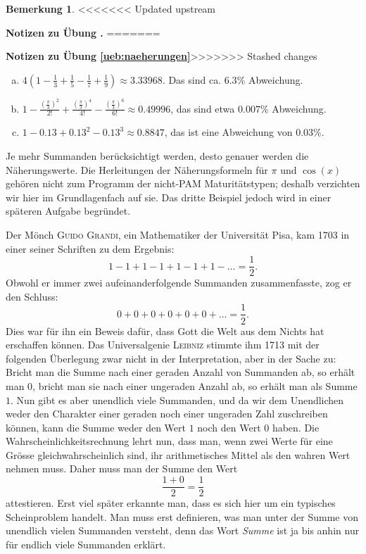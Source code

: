 \documentclass[%
11pt,%
twoside,%
titlepage,%
swissgerman,%
headsepline%
]{scrartcl}
\newcommand{\faReturnGray}{\textcolor{gray}{\faMailReply}} %
\theoremstyle{definition}
\newtheorem{bem}{Bemerkung}[subsection] %
\theoremstyle{plain}
\newcommand{\concatueb}[1]{ueb:#1}%
\newcommand{\concatlsg}[1]{lsg:#1}%
\newcounter{uebcounter}[section]
\renewcommand{\theuebcounter}{\thesection.\arabic{uebcounter}}  %
\newenvironment{lsg}[1]{%
<<<<<<< Updated upstream
    \par\noindent\textbf{Notizen zu Übung \theuebcounter\label{\concatlsg{#1}}}
=======
    \par\noindent\textbf{Notizen zu Übung \ref{\concatueb{#1}}}\label{\concatlsg{#1}}
>>>>>>> Stashed changes
    \hfill\hyperref[\concatueb{#1}]{\faReturnGray}\par %
}{%
    \par%
}
\begin{document}
\begin{bem}
\begin{lsg}{naeherungen}
    \begin{enumerate}[a)]
        \item $4(1-\frac{1}{3}+\frac{1}{5}-\frac{1}{7}+\frac{1}{9})\approx3.33968$. Das sind ca. $6.3\%$ Abweichung.
        \item $1-\frac{(\tfrac{\pi}{3})^2}{2!}+\frac{(\tfrac{\pi}{3})^4}{4!}-\frac{(\tfrac{\pi}{3})^6}{6!}\approx0.49996$, das sind etwa $0.007\%$ Abweichung.
        \item $1-0.13+0.13^2-0.13^3\approx0.8847$, das ist eine Abweichung von $0.03\%$.
    \end{enumerate}
\end{lsg}

Je mehr Summanden ber\"ucksichtigt werden, desto genauer werden die N\"aherungswerte. Die Herleitungen der N\"aherungsformeln f\"ur $\pi$ und $\cos(x)$ geh\"oren nicht zum Programm der nicht-PAM Maturit\"atstypen; deshalb verzichten wir hier im Grundlagenfach auf sie. Das dritte Beispiel jedoch wird in einer sp\"ateren Aufgabe begr\"undet.

Der M\"onch \textsc{Guido Grandi}, ein Mathematiker der Universit\"at Pisa, kam 1703 in einer seiner Schriften zu dem Ergebnis:
$$1-1+1-1+1-1+1-\dots=\frac{1}{2}.$$
Obwohl er immer zwei aufeinanderfolgende Summanden zusammenfasste, zog er den Schluss:
$$0+0+0+0+0+0+\dots=\frac{1}{2}.$$
Dies war f\"ur ihn ein Beweis daf\"ur, dass Gott die Welt aus dem Nichts hat erschaffen k\"onnen. Das Universalgenie \textsc{Leibniz} stimmte ihm 1713 mit der folgenden Überlegung zwar nicht in der Interpretation, aber in der Sache zu: Bricht man die Summe nach einer geraden Anzahl von Summanden ab, so erh\"alt man $0$, bricht man sie nach einer ungeraden Anzahl ab, so erh\"alt man als Summe $1$. Nun gibt es aber unendlich viele Summanden, und da wir dem Unendlichen weder den Charakter einer geraden noch einer ungeraden Zahl zuschreiben k\"onnen, kann die Summe weder den Wert $1$ noch den Wert $0$ haben. Die Wahrscheinlichkeitsrechnung lehrt nun, dass man, wenn zwei Werte f\"ur eine Gr\"osse gleichwahrscheinlich sind, ihr arithmetisches Mittel als den wahren Wert nehmen muss. Daher muss man der Summe den Wert
$$\frac{1+0}{2}=\frac{1}{2}$$
attestieren. Erst viel sp\"ater erkannte man, dass es sich hier um ein typisches Scheinproblem handelt. Man muss erst definieren, was man unter der Summe von unendlich vielen Summanden versteht, denn das Wort \emph{Summe} ist ja bis anhin nur f\"ur endlich viele Summanden erkl\"art.


\end{bem}
\end{document}
